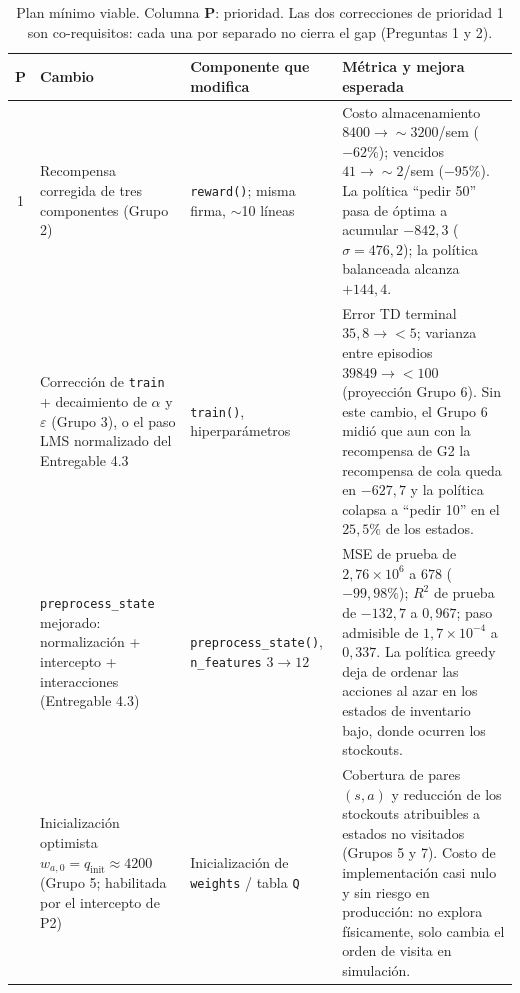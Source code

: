 \documentclass[11pt,letterpaper]{article}
\begin{document}
\begin{table}[h]
\centering
\footnotesize
\renewcommand{\arraystretch}{1.15}
\begin{tabular}{@{}c p{2.9cm} p{3.3cm} p{7.3cm}@{}}
\toprule
\textbf{P} & \textbf{Cambio} & \textbf{Componente que modifica} & \textbf{Métrica y mejora esperada} \\
\midrule
1 & Recompensa corregida de tres componentes (Grupo 2)
  & \texttt{reward()}; misma firma, $\sim$10 líneas
  & Costo almacenamiento $\num{8400}\to\sim\num{3200}$/sem ($-62\%$); vencidos
    $41 \to \sim 2$/sem ($-95\%$). La política ``pedir 50'' pasa de óptima a
    acumular $-842{,}3$ ($\sigma = 476{,}2$); la política balanceada alcanza
    $+144{,}4$. \\
\addlinespace
1 & Corrección de \texttt{train} + decaimiento de $\alpha$ y $\varepsilon$
    (Grupo 3), o el paso LMS normalizado del Entregable 4.3
  & \texttt{train()}, hiperparámetros
  & Error TD terminal $35{,}8 \to <5$; varianza entre episodios
    $\num{39849} \to <100$ (proyección Grupo 6). Sin este cambio, el Grupo 6
    midió que aun con la recompensa de G2 la recompensa de cola queda en
    $-627{,}7$ y la política colapsa a ``pedir 10'' en el $25{,}5\%$ de los estados. \\
\addlinespace
2 & \texttt{preprocess\_state} mejorado: normalización + intercepto +
    interacciones (Entregable 4.3)
  & \texttt{preprocess\_state()}, \texttt{n\_features} $3\to12$
  & MSE de prueba de $2{,}76\times10^{6}$ a $678$ ($-99{,}98\%$); $R^2$ de prueba
    de $-132{,}7$ a $0{,}967$; paso admisible de $1{,}7\times10^{-4}$ a $0{,}337$.
    La política greedy deja de ordenar las acciones al azar en los estados de
    inventario bajo, donde ocurren los stockouts. \\
\addlinespace
3 & Inicialización optimista $w_{a,0} = q_{\text{init}} \approx 4200$ (Grupo 5;
    habilitada por el intercepto de P2)
  & Inicialización de \texttt{weights} / tabla \texttt{Q}
  & Cobertura de pares $(s,a)$ y reducción de los stockouts atribuibles a
    estados no visitados (Grupos 5 y 7). Costo de implementación casi nulo y
    sin riesgo en producción: no explora físicamente, solo cambia el orden de
    visita en simulación. \\
\bottomrule
\end{tabular}
\caption{Plan mínimo viable. Columna \textbf{P}: prioridad. Las dos correcciones
de prioridad 1 son co-requisitos: cada una por separado no cierra el gap
(Preguntas 1 y 2).}
\label{tab:plan}
\end{table}
\end{document}
